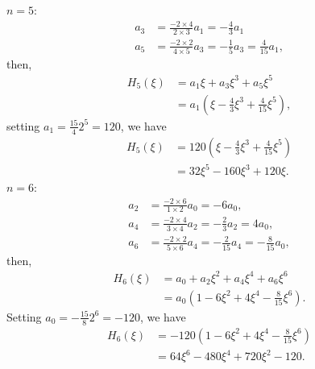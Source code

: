 \documentclass[en, oneside]{vivi}
\begin{document}
\begin{sol}
    $n = 5$:
    \begin{align*}
        a_3 &= \frac{-2 \times 4}{2 \times 3} a_1 = -\frac{4}{3} a_1\\
        a_5 &= \frac{-2 \times 2}{4 \times 5} a_3 = -\frac{1}{5} a_3 = \frac{4}{15} a_1,
    \end{align*}
    then,
    \begin{align*}
        H_5(\xi) &= a_1 \xi + a_3 \xi^3 + a_5 \xi^5\\
        &= a_1 \left( \xi - \frac{4}{3} \xi^3 + \frac{4}{15} \xi^5 \right),
    \end{align*}
    setting $a_1 = \frac{15}{4} 2^5 = 120$, we have
    \begin{align*}
        H_5(\xi) &= 120 \left( \xi - \frac{4}{3} \xi^3 + \frac{4}{15} \xi^5 \right)\\
        &= 32 \xi^5 - 160 \xi^3 + 120 \xi.
    \end{align*}
    $n = 6$:
    \begin{align*}
        a_2 &= \frac{-2 \times 6}{1 \times 2} a_0 = -6 a_0,\\
        a_4 &= \frac{-2 \times 4}{3 \times 4} a_2 = -\frac{2}{3} a_2 = 4 a_0,\\
        a_6 &= \frac{-2 \times 2}{5 \times 6} a_4 = -\frac{2}{15} a_4 = -\frac{8}{15} a_0,
    \end{align*}
    then,
    \begin{align*}
        H_6(\xi) &= a_0 + a_2 \xi^2 + a_4 \xi^4 + a_6 \xi^6\\
        &= a_0 \left( 1 - 6 \xi^2 + 4 \xi^4 - \frac{8}{15} \xi^6 \right).
    \end{align*}
    Setting $a_0 = -\frac{15}{8} 2^6 = -120$, we have
    \begin{align*}
        H_6(\xi) &= -120 \left( 1 - 6 \xi^2 + 4 \xi^4 - \frac{8}{15} \xi^6 \right)\\
        &= 64 \xi^6 - 480 \xi^4 + 720 \xi^2 - 120.
    \end{align*}
\end{sol}
\end{document}
